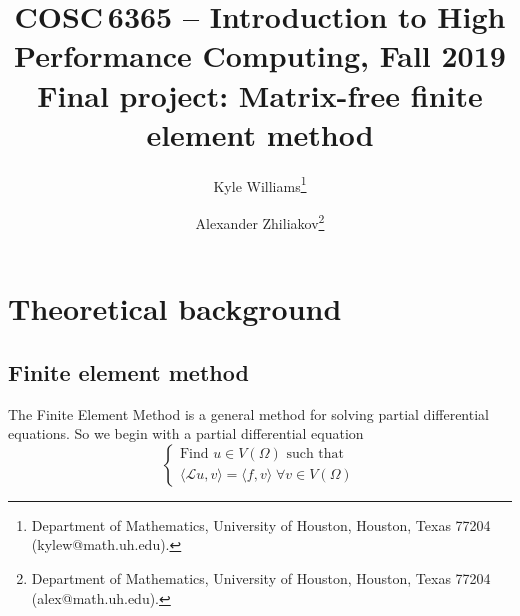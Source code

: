 \documentclass[12pt]{article}
\title{COSC\,6365 -- Introduction to High Performance Computing, Fall 2019\\Final project: \textbf{Matrix-free finite element method}}
\author{
	Kyle Williams\thanks{Department of Mathematics, University of Houston, Houston, Texas 77204 (kylew@math.uh.edu).} \and
	Alexander Zhiliakov\thanks{Department of Mathematics, University of Houston, Houston, Texas 77204 (alex@math.uh.edu).}
}
\begin{document}
	
\maketitle

\tableofcontents
\vfill
\clearpage
\let\oldtabular\tabular
\renewcommand{\tabular}[1][1.5]{\def\arraystretch{#1}\oldtabular}
\renewcommand\arraystretch{1.3}

\section{Theoretical background}

\subsection{Finite element method}
The Finite Element Method is a general method for solving partial differential equations. So we begin with a partial differential equation
\[
\begin{cases} 
	\text{Find } u \in V(\Omega) \text{ such that } \\
	\langle \mathcal{L}u, v \rangle = \langle f, v \rangle \; \forall v \in V(\Omega)
\end{cases}
\]
\end{document}
